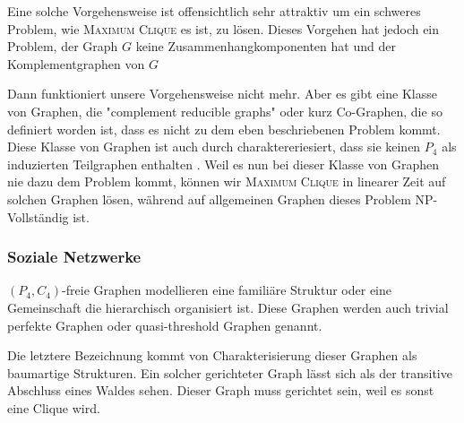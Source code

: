 \documentclass[12pt,a4paper,onecolumn,oneside,titlepage]{article}
\begin{document}
Eine solche Vorgehensweise ist offensichtlich sehr attraktiv um ein schweres Problem, wie \textsc{Maximum Clique} es ist, zu lösen. Dieses Vorgehen hat jedoch ein Problem, der Graph $G$ keine Zusammenhangkomponenten hat und der Komplementgraphen von $G$

Dann funktioniert unsere Vorgehensweise nicht mehr. 
Aber es gibt eine Klasse von Graphen, die "complement reducible graphs" oder kurz Co-Graphen, die so definiert worden ist, dass es nicht zu dem eben beschriebenen Problem kommt.
Diese Klasse von Graphen ist auch durch charaktereriesiert, dass sie keinen $P_4$ als induzierten Teilgraphen enthalten \cite{NastosG13}.
Weil es nun bei dieser Klasse von Graphen nie dazu dem Problem kommt, können wir \textsc{Maximum Clique} in linearer Zeit auf solchen Graphen lösen, während auf allgemeinen Graphen dieses Problem NP-Vollständig ist.


\subsubsection{Soziale Netzwerke}
$(P_4,C_4)$-freie Graphen modellieren eine familiäre Struktur oder eine Gemeinschaft die hierarchisch organisiert ist. Diese Graphen werden auch trivial perfekte Graphen oder quasi-threshold Graphen genannt\cite{Wolk65}. 

Die letztere Bezeichnung kommt von Charakterisierung dieser Graphen als baumartige Strukturen. Ein solcher gerichteter Graph lässt sich als der transitive Abschluss eines Waldes sehen\cite{BrandesHSW15}. Dieser Graph muss gerichtet sein, weil es sonst eine Clique wird.
\end{document}

